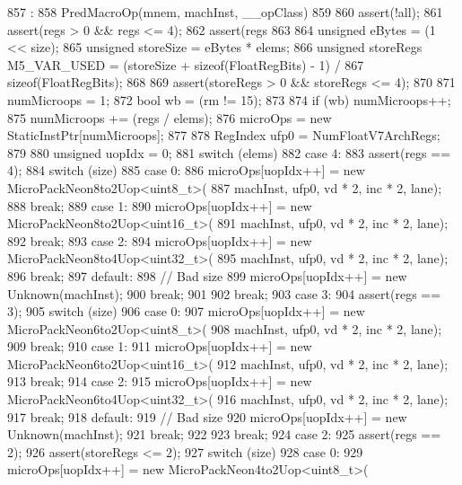 \begin{DoxyCode}
857                                                      :
858     PredMacroOp(mnem, machInst, __opClass)
859 {
860     assert(!all);
861     assert(regs > 0 && regs <= 4);
862     assert(regs %
863 
864     unsigned eBytes = (1 << size);
865     unsigned storeSize = eBytes * elems;
866     unsigned storeRegs M5_VAR_USED = (storeSize + sizeof(FloatRegBits) - 1) /
867                          sizeof(FloatRegBits);
868 
869     assert(storeRegs > 0 && storeRegs <= 4);
870 
871     numMicroops = 1;
872     bool wb = (rm != 15);
873 
874     if (wb) numMicroops++;
875     numMicroops += (regs / elems);
876     microOps = new StaticInstPtr[numMicroops];
877 
878     RegIndex ufp0 = NumFloatV7ArchRegs;
879 
880     unsigned uopIdx = 0;
881     switch (elems) {
882       case 4:
883         assert(regs == 4);
884         switch (size) {
885           case 0:
886             microOps[uopIdx++] = new MicroPackNeon8to2Uop<uint8_t>(
887                     machInst, ufp0, vd * 2, inc * 2, lane);
888             break;
889           case 1:
890             microOps[uopIdx++] = new MicroPackNeon8to2Uop<uint16_t>(
891                     machInst, ufp0, vd * 2, inc * 2, lane);
892             break;
893           case 2:
894             microOps[uopIdx++] = new MicroPackNeon8to4Uop<uint32_t>(
895                     machInst, ufp0, vd * 2, inc * 2, lane);
896             break;
897           default:
898             // Bad size
899             microOps[uopIdx++] = new Unknown(machInst);
900             break;
901         }
902         break;
903       case 3:
904         assert(regs == 3);
905         switch (size) {
906           case 0:
907             microOps[uopIdx++] = new MicroPackNeon6to2Uop<uint8_t>(
908                     machInst, ufp0, vd * 2, inc * 2, lane);
909             break;
910           case 1:
911             microOps[uopIdx++] = new MicroPackNeon6to2Uop<uint16_t>(
912                     machInst, ufp0, vd * 2, inc * 2, lane);
913             break;
914           case 2:
915             microOps[uopIdx++] = new MicroPackNeon6to4Uop<uint32_t>(
916                     machInst, ufp0, vd * 2, inc * 2, lane);
917             break;
918           default:
919             // Bad size
920             microOps[uopIdx++] = new Unknown(machInst);
921             break;
922         }
923         break;
924       case 2:
925         assert(regs == 2);
926         assert(storeRegs <= 2);
927         switch (size) {
928           case 0:
929             microOps[uopIdx++] = new MicroPackNeon4to2Uop<uint8_t>(
}}}
\end{DoxyCode}

